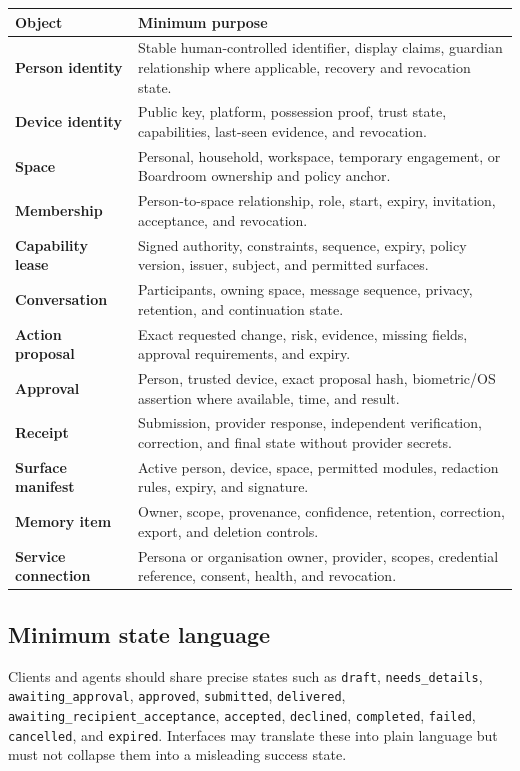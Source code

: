 \documentclass[11pt,a4paper]{article}
\begin{document}
\begin{longtable}{@{}>{\bfseries}p{33mm}p{120mm}@{}}
\toprule
Object & Minimum purpose \\
\midrule
Person identity & Stable human-controlled identifier, display claims, guardian relationship where applicable, recovery and revocation state. \\
Device identity & Public key, platform, possession proof, trust state, capabilities, last-seen evidence, and revocation. \\
Space & Personal, household, workspace, temporary engagement, or Boardroom ownership and policy anchor. \\
Membership & Person-to-space relationship, role, start, expiry, invitation, acceptance, and revocation. \\
Capability lease & Signed authority, constraints, sequence, expiry, policy version, issuer, subject, and permitted surfaces. \\
Conversation & Participants, owning space, message sequence, privacy, retention, and continuation state. \\
Action proposal & Exact requested change, risk, evidence, missing fields, approval requirements, and expiry. \\
Approval & Person, trusted device, exact proposal hash, biometric/OS assertion where available, time, and result. \\
Receipt & Submission, provider response, independent verification, correction, and final state without provider secrets. \\
Surface manifest & Active person, device, space, permitted modules, redaction rules, expiry, and signature. \\
Memory item & Owner, scope, provenance, confidence, retention, correction, export, and deletion controls. \\
Service connection & Persona or organisation owner, provider, scopes, credential reference, consent, health, and revocation. \\
\bottomrule
\end{longtable}

\subsection{Minimum state language}

Clients and agents should share precise states such as
\texttt{draft}, \texttt{needs\_details}, \texttt{awaiting\_approval},
\texttt{approved}, \texttt{submitted}, \texttt{delivered},
\texttt{awaiting\_recipient\_acceptance}, \texttt{accepted},
\texttt{declined}, \texttt{completed}, \texttt{failed},
\texttt{cancelled}, and \texttt{expired}.  Interfaces may translate these into
plain language but must not collapse them into a misleading success state.
\end{document}
